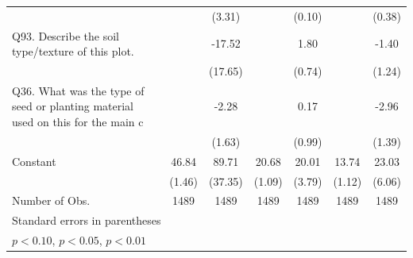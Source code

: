 {\begin{tabular}{l*{6}{c}}
                    &                     &      (3.31)         &                     &      (0.10)         &                     &      (0.38)         \\
[1em]
Q93. Describe the soil type/texture of this  plot.&                     &      -17.52         &                     &        1.80\sym{**} &                     &       -1.40         \\
                    &                     &     (17.65)         &                     &      (0.74)         &                     &      (1.24)         \\
[1em]
Q36. What was the type of seed or planting material used on this  for the main c&                     &       -2.28         &                     &        0.17         &                     &       -2.96\sym{**} \\
                    &                     &      (1.63)         &                     &      (0.99)         &                     &      (1.39)         \\
[1em]
Constant            &       46.84\sym{***}&       89.71\sym{**} &       20.68\sym{***}&       20.01\sym{***}&       13.74\sym{***}&       23.03\sym{***}\\
                    &      (1.46)         &     (37.35)         &      (1.09)         &      (3.79)         &      (1.12)         &      (6.06)         \\
\hline
Number of Obs.      &        1489         &        1489         &        1489         &        1489         &        1489         &        1489         \\
\hline\hline
\multicolumn{7}{l}{\footnotesize Standard errors in parentheses}\\
\multicolumn{7}{l}{\footnotesize \sym{*} \(p<0.10\), \sym{**} \(p<0.05\), \sym{***} \(p<0.01\)}\\
\end{tabular}
}
